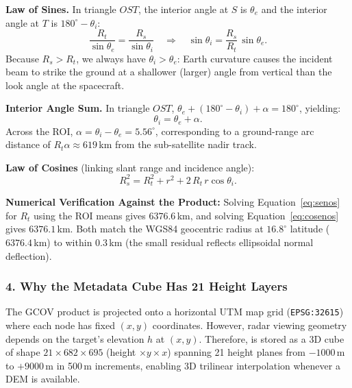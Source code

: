 \documentclass[11pt,a4paper]{article}
\begin{document}
\textbf{Law of Sines.} In triangle $OST$, the interior angle at $S$ is $\theta_e$ and the interior angle at $T$ is $180^\circ - \theta_i$:
\begin{equation}
  \frac{R_t}{\sin\theta_e} = \frac{R_s}{\sin\theta_i}
  \quad\Longrightarrow\quad
  \sin\theta_i = \frac{R_s}{R_t}\,\sin\theta_e .
  \label{eq:senos}
\end{equation}
Because $R_s > R_t$, we always have $\theta_i > \theta_e$: Earth curvature causes the incident beam to strike the ground at a shallower (larger) angle from vertical than the look angle at the spacecraft.

\textbf{Interior Angle Sum.} In triangle $OST$, $\theta_e + (180^\circ - \theta_i) + \alpha = 180^\circ$, yielding:
\begin{equation}
  \theta_i = \theta_e + \alpha .
\end{equation}
Across the ROI, $\alpha = \theta_i - \theta_e = 5.56^\circ$, corresponding to a ground-range arc distance of $R_t\alpha \approx 619$\,km from the sub-satellite nadir track.

\textbf{Law of Cosines} (linking slant range and incidence angle):
\begin{equation}
  R_s^2 = R_t^2 + r^2 + 2\,R_t\, r\cos\theta_i .
  \label{eq:cosenos}
\end{equation}

\textbf{Numerical Verification Against the Product:} Solving Equation~\eqref{eq:senos} for $R_t$ using the ROI means gives $6376.6$\,km, and solving Equation~\eqref{eq:cosenos} gives $6376.1$\,km. Both match the WGS84 geocentric radius at $16.8^\circ$ latitude ($6376.4$\,km) to within $0.3$\,km (the small residual reflects ellipsoidal normal deflection).

\subsubsection*{4. Why the Metadata Cube Has 21 Height Layers}

The GCOV product is projected onto a horizontal UTM map grid (\texttt{EPSG:32615}) where each node has fixed $(x, y)$ coordinates. However, radar viewing geometry depends on the target's elevation $h$ at $(x, y)$. Therefore,  is stored as a 3D cube of shape $21 \times 682 \times 695$ (height $\times y \times x$) spanning 21 height planes from $-1000$\,m to $+9000$\,m in 500\,m increments, enabling 3D trilinear interpolation whenever a DEM is available.
\end{document}
